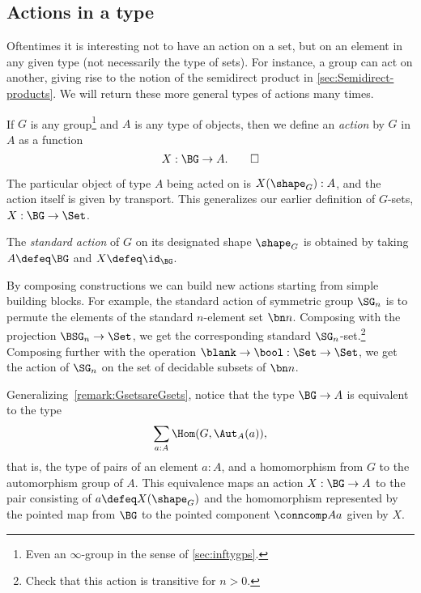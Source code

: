 \subsection{Actions in a type}
\label{sec:actions}
Oftentimes it is interesting not to have an action on a set, but on an element in any given type (not necessarily the type of sets).  For instance, a group can act on another, giving rise to the notion of the semidirect product in \cref{sec:Semidirect-products}.  We will return these more general types of actions many times.

\begin{definition}\label{action}
  If $G$ is any group\footnote{%
  Even an $\infty$-group in the sense of \cref{sec:inftygps}.} 
  and $A$ is any type of objects,
  then we define an \emph{action} by $G$ in %
  $A$ as a function
  \[
    X : \BG \to A.\qedhere
  \]
\end{definition}

The particular object of type $A$ being acted on is $X(\shape_G):A$,
and the action itself is given by transport.
This generalizes our earlier definition of $G$-sets, $X : \BG \to \Set$.

\begin{definition}\label{std-action}
  The \emph{standard action} of $G$ on its designated shape $\shape_G$ is obtained by
  taking $A \defeq \BG$ and $X \defeq \id_{\BG}$.
\end{definition}

\begin{example}
  By composing constructions we can build new actions
  starting from simple building blocks.
  For example, the standard action of symmetric group $\SG_n$
  is to permute the elements of the standard $n$-element set $\bn n$.
  Composing with the projection $\BSG_n \to \Set$,
  we get the corresponding standard $\SG_n$-set.\footnote{%
    Check that this action is transitive for $n>0$.}
  Composing further with the operation $\blank \to \bool : \Set \to \Set$,
  we get the action of $\SG_n$ on the set of decidable subsets of $\bn n$.
\end{example}

Generalizing~\cref{remark:GsetsareGsets},
notice that the type $\BG \to A$ is equivalent to the type
\[
  \sum_{a:A}\Hom(G,\Aut_A(a)),
\]
that is, the type of pairs of an element $a : A$,
and a homomorphism from $G$ to the automorphism group of $A$.
This equivalence maps an action $X:\BG\to A$
to the pair consisting of $a \defeq X(\shape_G)$
and the homomorphism represented by the pointed map
from $\BG$ to the pointed component $\conncomp A a$ given by $X$.

